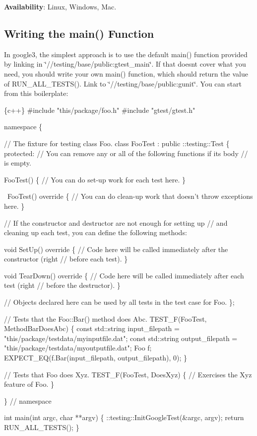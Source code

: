 {\bfseries Availability}\+: Linux, Windows, Mac.

\subsection*{Writing the main() Function}

In {\ttfamily google3}, the simplest approach is to use the default main() function provided by linking in {\ttfamily \char`\"{}//testing/base/public\+:gtest\+\_\+main\char`\"{}}. If that doesn\textquotesingle{}t cover what you need, you should write your own main() function, which should return the value of {\ttfamily R\+U\+N\+\_\+\+A\+L\+L\+\_\+\+T\+E\+S\+T\+S()}. Link to {\ttfamily \char`\"{}//testing/base/public\+:gunit\char`\"{}}. You can start from this boilerplate\+:


\begin{DoxyCode}
\{c++\}
#include "this/package/foo.h"
#include "gtest/gtest.h"

namespace \{

// The fixture for testing class Foo.
class FooTest : public ::testing::Test \{
 protected:
  // You can remove any or all of the following functions if its body
  // is empty.

  FooTest() \{
     // You can do set-up work for each test here.
  \}

  ~FooTest() override \{
     // You can do clean-up work that doesn't throw exceptions here.
  \}

  // If the constructor and destructor are not enough for setting up
  // and cleaning up each test, you can define the following methods:

  void SetUp() override \{
     // Code here will be called immediately after the constructor (right
     // before each test).
  \}

  void TearDown() override \{
     // Code here will be called immediately after each test (right
     // before the destructor).
  \}

  // Objects declared here can be used by all tests in the test case for Foo.
\};

// Tests that the Foo::Bar() method does Abc.
TEST\_F(FooTest, MethodBarDoesAbc) \{
  const std::string input\_filepath = "this/package/testdata/myinputfile.dat";
  const std::string output\_filepath = "this/package/testdata/myoutputfile.dat";
  Foo f;
  EXPECT\_EQ(f.Bar(input\_filepath, output\_filepath), 0);
\}

// Tests that Foo does Xyz.
TEST\_F(FooTest, DoesXyz) \{
  // Exercises the Xyz feature of Foo.
\}

\}  // namespace

int main(int argc, char **argv) \{
  ::testing::InitGoogleTest(&argc, argv);
  return RUN\_ALL\_TESTS();
\}
\end{DoxyCode}


